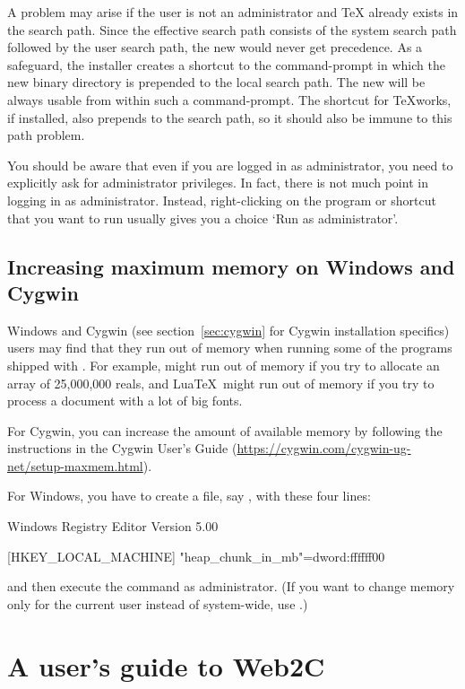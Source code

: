 \documentclass{article}
\begin{document}
A problem may arise if the user is not an administrator and \TeX{}
already exists in the search path.  Since the effective search path
consists of the system search path followed by the user search path, the
new \TL{} would never get precedence.  As a safeguard, the installer
creates a shortcut to the command-prompt in which the new \TL{} binary
directory is prepended to the local search path.  The new \TL{} will be
always usable from within such a command-prompt. The shortcut for
\TeX{}works, if installed, also prepends \TL{} to the search path, so it
should also be immune to this path problem.

You should be aware that even if you are logged in as administrator, you
need to explicitly ask for administrator privileges. In fact, there is
not much point in logging in as administrator. Instead, right-clicking
on the program or shortcut that you want to run usually gives you a
choice `Run as administrator'.


\subsection{Increasing maximum memory on Windows and Cygwin}
\label{sec:cygwin-maxmem}

Windows and Cygwin (see section~\ref{sec:cygwin} for Cygwin installation
specifics) users may find that they run out of memory when running some
of the programs shipped with \TL.  For example,  might run out
of memory if you try to allocate an array of 25,000,000 reals, and
Lua\TeX\ might run out of memory if you try to process a document with a
lot of big fonts.

For Cygwin, you can increase the amount of available memory by following
the instructions in the Cygwin User's Guide
(\url{https://cygwin.com/cygwin-ug-net/setup-maxmem.html}).

For Windows, you have to create a file, say , with
these four lines:

\begin{sverbatim}
Windows Registry Editor Version 5.00

[HKEY_LOCAL_MACHINE\Software\Cygwin]
"heap_chunk_in_mb"=dword:ffffff00
\end{sverbatim}

\noindent and then execute the command  as
administrator.  (If you want to change memory only for the current user
instead of system-wide, use .)


\section{A user's guide to Web2C}
\end{document}
